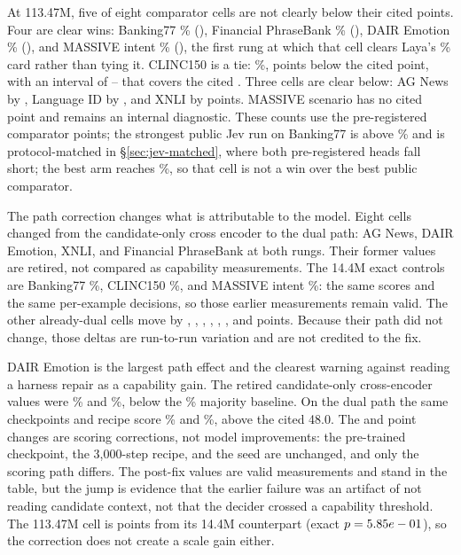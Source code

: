At 113.47M, five of eight comparator cells are not clearly below their cited
points. Four are clear wins: Banking77 \SuiteLargeBank\% (\SuiteLargeGapBank),
Financial PhraseBank \SuiteLargeFinancial\% (\SuiteLargeGapFinancial), DAIR
Emotion \SuiteLargeEmotion\% (\SuiteLargeGapEmotion), and MASSIVE intent
\SuiteLargeMassiveIntent\% (\SuiteLargeGapMassiveIntent), the first rung at which
that cell clears Laya's \SuiteCitedMassiveIntent\% card rather than tying it.
CLINC150 is a tie: \SuiteLargeClinc\%, \SuiteLargeShortClinc{} points below the
cited point, with an interval of \SuiteLargeClincLo--\SuiteLargeClincHi{} that
covers the cited \SuiteCitedClinc. Three cells are clear below: AG News by
\SuiteLargeShortAg, Language ID by \SuiteLargeShortLang, and XNLI by
\SuiteLargeShortXnli{} points. MASSIVE scenario has no
cited point and remains an internal diagnostic. These counts use the
pre-registered comparator points; the strongest public Jev run on Banking77 is
above \SuiteLargeBank\% and is protocol-matched in \S\ref{sec:jev-matched},
where both pre-registered heads fall short; the best arm reaches
\QueryPctQueryTwo\%, so that cell is not a win over the best public comparator.


The path correction changes what is attributable to the model. Eight cells
changed from the candidate-only cross encoder to the dual path: AG News, DAIR
Emotion, XNLI, and Financial PhraseBank at both rungs. Their former values are
retired, not compared as capability measurements. The 14.4M exact controls are
Banking77 \SuiteSmallBank\%, CLINC150 \SuiteSmallClinc\%, and MASSIVE intent
\SuiteSmallMassiveIntent\%: the same scores and the same per-example decisions,
so those earlier measurements remain valid. The other already-dual cells move
by \SuiteSmallDeltaMassiveScenario, \SuiteSmallDeltaLang,
\SuiteMidDeltaBank, \SuiteMidDeltaClinc, \SuiteMidDeltaMassiveIntent,
\SuiteMidDeltaMassiveScenario, and \SuiteMidDeltaLang{} points. Because their
path did not change, those deltas are run-to-run variation and are not credited
to the fix.

DAIR Emotion is the largest path effect and the clearest warning against
reading a harness repair as a capability gain. The retired candidate-only
cross-encoder values were \SuiteSmallPriorEmotion\% and \SuiteMidPriorEmotion\%,
below the \SuiteEmotionMajority\% majority baseline. On the dual path the same
checkpoints and recipe score \SuiteSmallEmotion\% and \SuiteMidEmotion\%,
above the cited 48.0. The \SuiteSmallDeltaEmotion{} and \SuiteMidDeltaEmotion{}
point changes are scoring corrections, not model improvements: the pre-trained
checkpoint, the 3{,}000-step recipe, and the seed are unchanged, and only the
scoring path differs. The post-fix values are valid measurements and stand in the table, but
the jump is evidence that the earlier failure was an artifact of not reading
candidate context, not that the decider crossed a capability threshold. The
113.47M cell is \SuiteLargeVsSmallEmotion{} points from its 14.4M counterpart
(exact $p = 5.85e-01$), so the correction does not create a
scale gain either.

